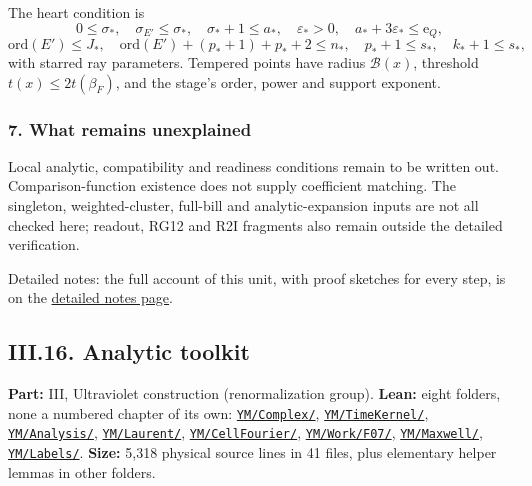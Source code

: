 \documentclass[
  letterpaper,
  11pt]{article}
\newcounter{none} %
\begin{document}
The heart condition is
\[0\le\sigma_*,\quad\sigma_{E'}\le\sigma_*,\quad\sigma_*+1\le a_*,\quad\varepsilon_*>0,\quad a_*+3\varepsilon_*\le\mathrm e_Q,\]
\[\mathrm{ord}(E')\le J_*,\quad\mathrm{ord}(E')+(p_*+1)+p_*+2\le n_*,\quad p_*+1\le s_*,\quad k_*+1\le s_*,\]
with starred ray parameters. Tempered points have radius
\(\mathcal B(x)\), threshold \(t(x)\le2t(\beta_F)\), and the stage's
order, power and support exponent.

\subsubsection{7. What remains
unexplained}\label{what-remains-unexplained-17}

Local analytic, compatibility and readiness conditions remain to be
written out. Comparison-function existence does not supply coefficient
matching. The singleton, weighted-cluster, full-bill and
analytic-expansion inputs are not all checked here; readout, RG12 and
R2I fragments also remain outside the detailed verification.

Detailed notes: the full account of this unit, with proof sketches for
every step, is on the
\href{https://github.com/scottnarmstrong/yang-mills-informalization/blob/main/outline/notes/III-15.md}{detailed
notes page}.

\subsection{III.16. Analytic toolkit}\label{iii.16.-analytic-toolkit}

\textbf{Part:} III, Ultraviolet construction (renormalization group).
\textbf{Lean:} eight folders, none a numbered chapter of its own:
\href{https://github.com/yang-mills-group/OpenAI-YM-20261028/tree/3456e5e75cf8d4cd558955a5c7638fba2d68f464/YM/Complex}{\texttt{YM/Complex/}},
\href{https://github.com/yang-mills-group/OpenAI-YM-20261028/tree/3456e5e75cf8d4cd558955a5c7638fba2d68f464/YM/TimeKernel}{\texttt{YM/TimeKernel/}},
\href{https://github.com/yang-mills-group/OpenAI-YM-20261028/tree/3456e5e75cf8d4cd558955a5c7638fba2d68f464/YM/Analysis}{\texttt{YM/Analysis/}},
\href{https://github.com/yang-mills-group/OpenAI-YM-20261028/tree/3456e5e75cf8d4cd558955a5c7638fba2d68f464/YM/Laurent}{\texttt{YM/Laurent/}},
\href{https://github.com/yang-mills-group/OpenAI-YM-20261028/tree/3456e5e75cf8d4cd558955a5c7638fba2d68f464/YM/CellFourier}{\texttt{YM/CellFourier/}},
\href{https://github.com/yang-mills-group/OpenAI-YM-20261028/tree/3456e5e75cf8d4cd558955a5c7638fba2d68f464/YM/Work/F07}{\texttt{YM/Work/F07/}},
\href{https://github.com/yang-mills-group/OpenAI-YM-20261028/tree/3456e5e75cf8d4cd558955a5c7638fba2d68f464/YM/Maxwell}{\texttt{YM/Maxwell/}},
\href{https://github.com/yang-mills-group/OpenAI-YM-20261028/tree/3456e5e75cf8d4cd558955a5c7638fba2d68f464/YM/Labels}{\texttt{YM/Labels/}}.
\textbf{Size:} 5,318 physical source lines in 41 files, plus elementary
helper lemmas in other folders.
\end{document}
